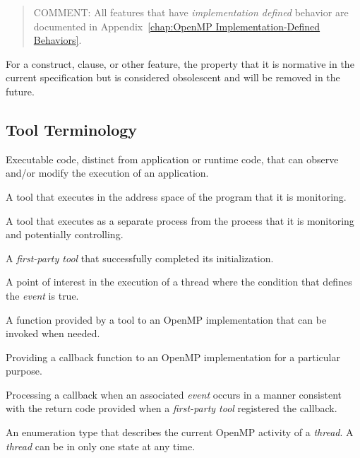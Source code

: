 \begin{quote}
COMMENT: All features that have \emph{implementation defined} behavior
are documented in Appendix~\ref{chap:OpenMP Implementation-Defined Behaviors}.
\end{quote}
\glossarydefend

\glossarydefstart
For a construct, clause, or other feature, the property that it is normative 
in the current specification but is considered obsolescent and will be 
removed in the future.
\glossarydefend


\subsection{Tool Terminology}

\glossarydefstart
Executable code, distinct from application or runtime code, that can observe 
and/or modify the execution of an application.
\glossarydefend

\glossarydefstart
A tool that executes in the address space of the program that it is monitoring.
\glossarydefend

\glossarydefstart
A tool that executes as a separate process from the process that it is 
monitoring and potentially controlling.
\glossarydefend

\glossarydefstart
A \emph{first-party tool} that successfully completed its initialization.
\glossarydefend

\glossarydefstart
A point of interest in the execution of a thread where the condition
that defines the \emph{event} is true.
\glossarydefend

\glossarydefstart
A function provided by a tool to an OpenMP implementation that can be 
invoked when needed.
\glossarydefend

\glossarydefstart
Providing a callback function to an OpenMP implementation for a particular 
purpose.
\glossarydefend

\glossarydefstart
Processing a callback when an associated \emph{event} occurs in a manner 
consistent with the return code provided when a \emph{first-party tool} 
registered the callback.
\glossarydefend

\glossarydefstart
An enumeration type that describes the current OpenMP activity  of a 
\emph{thread}. A \emph{thread} can be in only one state at any time.
\glossarydefend

